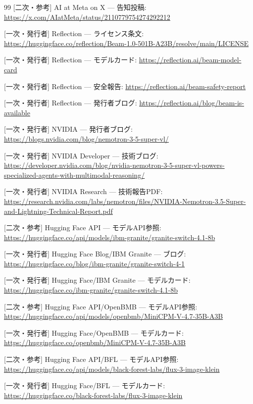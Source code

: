 \documentclass[lualatex,a4paper,10pt]{jlreq}
\begin{document}
\begin{thebibliography}{99}
 [二次・参考] AI at Meta on X — 告知投稿: \url{https://x.com/AIatMeta/status/2110779754274292212}

 [一次・発行者] Reflection — ライセンス条文: \url{https://huggingface.co/reflection/Beam-1.0-501B-A23B/resolve/main/LICENSE}

 [一次・発行者] Reflection — モデルカード: \url{https://reflection.ai/beam-model-card}

 [一次・発行者] Reflection — 安全報告: \url{https://reflection.ai/beam-safety-report}

 [一次・発行者] Reflection — 発行者ブログ: \url{https://reflection.ai/blog/beam-is-available}

 [一次・発行者] NVIDIA — 発行者ブログ: \url{https://blogs.nvidia.com/blog/nemotron-3-5-super-vl/}

 [一次・発行者] NVIDIA Developer — 技術ブログ: \url{https://developer.nvidia.com/blog/nvidia-nemotron-3-5-super-vl-powers-specialized-agents-with-multimodal-reasoning/}

 [一次・発行者] NVIDIA Research — 技術報告PDF: \url{https://research.nvidia.com/labs/nemotron/files/NVIDIA-Nemotron-3.5-Super-and-Lightning-Technical-Report.pdf}

 [二次・参考] Hugging Face API — モデルAPI参照: \url{https://huggingface.co/api/models/ibm-granite/granite-switch-4.1-8b}

 [一次・発行者] Hugging Face Blog/IBM Granite — ブログ: \url{https://huggingface.co/blog/ibm-granite/granite-switch-4-1}

 [一次・発行者] Hugging Face/IBM Granite — モデルカード: \url{https://huggingface.co/ibm-granite/granite-switch-4.1-8b}

 [二次・参考] Hugging Face API/OpenBMB — モデルAPI参照: \url{https://huggingface.co/api/models/openbmb/MiniCPM-V-4.7-35B-A3B}

 [一次・発行者] Hugging Face/OpenBMB — モデルカード: \url{https://huggingface.co/openbmb/MiniCPM-V-4.7-35B-A3B}

 [二次・参考] Hugging Face API/BFL — モデルAPI参照: \url{https://huggingface.co/api/models/black-forest-labs/flux-3-image-klein}

 [一次・発行者] Hugging Face/BFL — モデルカード: \url{https://huggingface.co/black-forest-labs/flux-3-image-klein}


\end{thebibliography}
\end{document}
